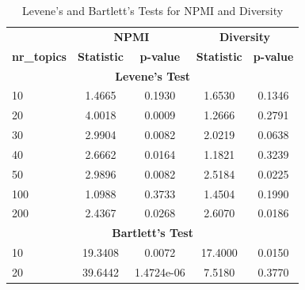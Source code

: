 \begin{table}[htbp]
    \centering
    \caption{Levene's and Bartlett's Tests for NPMI and Diversity}
    \begin{tabular}{@{}lcc|cc@{}}
        \toprule
                            & \multicolumn{2}{c}{\textbf{NPMI}} & \multicolumn{2}{c}{\textbf{Diversity}}                                         \\ \cmidrule(lr){2-3} \cmidrule(lr){4-5}
        \textbf{nr\_topics} & \textbf{Statistic}                & \textbf{p-value}                       & \textbf{Statistic} & \textbf{p-value} \\ \midrule
        \multicolumn{5}{c}{\textbf{Levene's Test}}                                                                                               \\ \midrule
        10                  & 1.4665                            & 0.1930                                 & 1.6530             & 0.1346           \\
        20                  & 4.0018                            & 0.0009                                 & 1.2666             & 0.2791           \\
        30                  & 2.9904                            & 0.0082                                 & 2.0219             & 0.0638           \\
        40                  & 2.6662                            & 0.0164                                 & 1.1821             & 0.3239           \\
        50                  & 2.9896                            & 0.0082                                 & 2.5184             & 0.0225           \\
        100                 & 1.0988                            & 0.3733                                 & 1.4504             & 0.1990           \\
        200                 & 2.4367                            & 0.0268                                 & 2.6070             & 0.0186           \\ \midrule
        \multicolumn{5}{c}{\textbf{Bartlett's Test}}                                                                                             \\ \midrule
        10                  & 19.3408                           & 0.0072                                 & 17.4000            & 0.0150           \\
        20                  & 39.6442                           & 1.4724e-06                             & 7.5180             & 0.3770           \\

\end{tabular}
\end{table}
